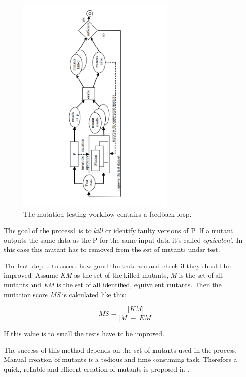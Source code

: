 \documentclass{llncs}
\begin{document}
\begin{figure}
	\centering
	\includegraphics[width=0.7\textwidth]{figures/Mutation_Process}
	\caption{The mutation testing workflow contains a feedback loop.\cite{MatMottu2006}}
	\label{fig:Mutation_Process}
\end{figure}

The goal of the process\ref{fig:Mutation_Process} is to \textit{kill} or identify faulty versions of P. If a mutant outputs the same data as the P for the same input data it's called \textit{equivalent}. In this case this mutant has to removed from the set of mutants under test.

The last step is to assess how good the tests are and check if they should be improved. Assume \textit{KM} as the set of the killed mutants, \textit{M} is the set of all mutants and \textit{EM} is the set of all identified, equivalent mutants. Then the mutation score \textit{MS} is calculated like this:\cite{mutationssurvey:yue}

\begin{equation}
	MS = \frac{\left|KM\right|}{\left|M\right| - \left|EM\right|}
	\label{eq:ms}
\end{equation}

If this value is to small the tests have to be improved. 

The success of this method depends on the set of mutants used in the process. Manual creation of mutants is a tedious and time consuming task. Therefore a quick, reliable and efficent creation of mutants is proposed in \cite{troya:2015}.
\end{document}

